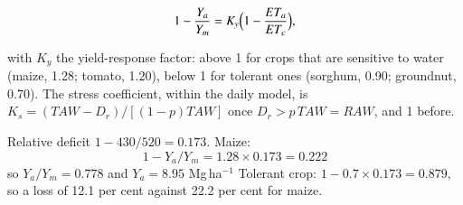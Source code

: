 \begin{equation}1-\frac{Y_a}{Y_m}=K_y\Bigl(1-\frac{ET_a}{ET_c}\Bigr),\label{eq:ky}\end{equation}


with $K_y$ the yield-response factor: above 1 for crops that are sensitive to water (maize, 1.28; tomato, 1.20), below 1 for tolerant ones (sorghum, 0.90; groundnut, 0.70). The stress coefficient, within the daily model, is $K_s=(TAW-D_r)/[(1-p)TAW]$ once $D_r>p\,TAW=RAW$, and 1 before.

\sol {}\ans Relative deficit $1-430/520=0.173$. Maize: \[1-Y_a/Y_m=1.28\times0.173=0.222\]
so $Y_a/Y_m=0.778$ and $Y_a=8.95$ Mg\,ha$^{-1}$ \ans Tolerant crop: $1-0.7\times0.173=0.879$, so a loss of 12.1 per cent against 22.2 per cent for maize. \finans

